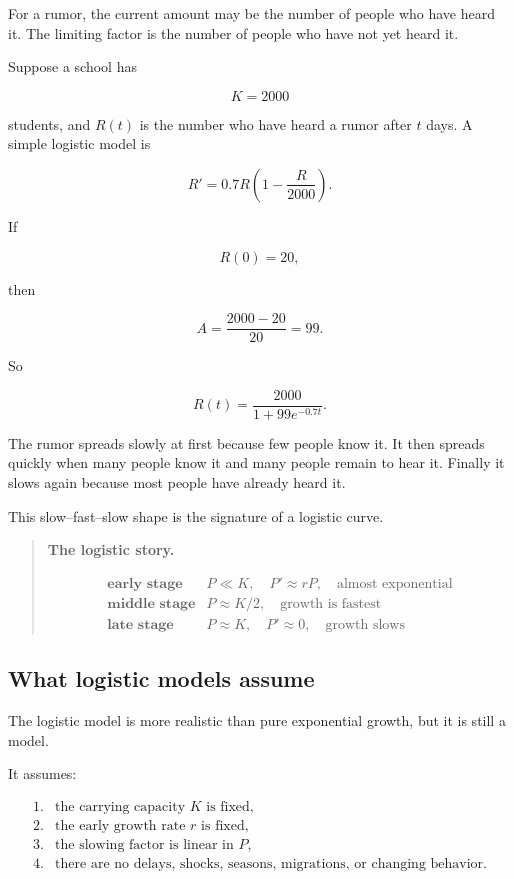 For a rumor, the current amount may be the number of people who have heard it.  The
limiting factor is the number of people who have not yet heard it.

Suppose a school has

\[
K=2000
\]

students, and \(R(t)\) is the number who have heard a rumor after \(t\) days.  A simple
logistic model is

\[
R'=0.7R\left(1-\frac{R}{2000}\right).
\]

If

\[
R(0)=20,
\]

then

\[
A=\frac{2000-20}{20}=99.
\]

So

\[
R(t)=\frac{2000}{1+99e^{-0.7t}}.
\]

The rumor spreads slowly at first because few people know it.  It then spreads quickly
when many people know it and many people remain to hear it.  Finally it slows again
because most people have already heard it.

This slow--fast--slow shape is the signature of a logistic curve.

\begin{quote}
\textbf{The logistic story.}

\[
\begin{array}{c|c}
\textbf{early stage} & P\ll K,\quad P'\approx rP,\quad \text{almost exponential} \\[4pt]
\textbf{middle stage} & P\approx K/2,\quad \text{growth is fastest} \\[4pt]
\textbf{late stage} & P\approx K,\quad P'\approx0,\quad \text{growth slows}
\end{array}
\]
\end{quote}

\subsection{What logistic models assume}
\label{subsec:what-logistic-models-assume}

The logistic model is more realistic than pure exponential growth, but it is still a
model.

It assumes:

\[
\begin{array}{ll}
\text{1.} & \text{the carrying capacity \(K\) is fixed,}\\
\text{2.} & \text{the early growth rate \(r\) is fixed,}\\
\text{3.} & \text{the slowing factor is linear in \(P\),}\\
\text{4.} & \text{there are no delays, shocks, seasons, migrations, or changing behavior.}
\end{array}
\]

